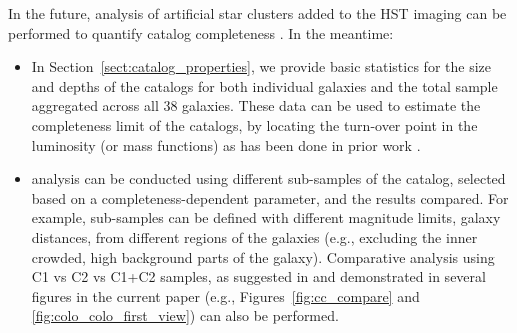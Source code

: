 \documentclass[linenumbers]{aastex63}
\begin{document}
{In the future, analysis of artificial star clusters added to the HST imaging can be performed to quantify catalog completeness \citep[e.g.,][]{adamo_legacy_2017, tang_cluster_2023}.  In the meantime:
\begin{itemize}
\item In Section~\ref{sect:catalog_properties}, we provide basic statistics for the size and depths of the catalogs for both individual galaxies and the total sample aggregated across all 38 galaxies.  These data can be used to estimate the completeness limit of the catalogs, by locating the turn-over point in the luminosity (or mass functions) as has been done in prior work \citep[e.g.,][]{ryon_effective_2017, cook_star_2019}.
\item analysis can be conducted using different sub-samples of the catalog, selected based on a completeness-dependent parameter, and the results compared.  For example, sub-samples can be defined with different magnitude limits, galaxy distances, from different regions of the galaxies (e.g., excluding the inner crowded, high background parts of the galaxy).  Comparative analysis using C1 vs C2 vs C1+C2 samples, as suggested in \citet{whitmore_star_2021} and demonstrated in several figures in the current paper (e.g., Figures~\ref{fig:cc_compare} and \ref{fig:colo_colo_first_view}) can also be performed.
\end{itemize}

}
\end{document}
